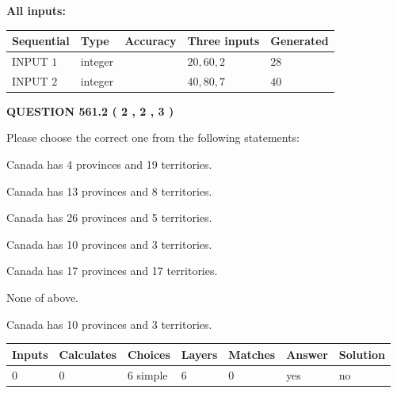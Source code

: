 \documentclass[12pt]{article}
\begin{document}
   
   
   
\noindent\vspace{0.1in}\hspace{-0.08in} {\textbf{\Large{All inputs: }}}
   
   
  
  
\noindent\begin{tabular}{|l|l|l|l|l|}
\hline
 Sequential & Type & Accuracy & Three inputs & Generated \\ 
\hline
 
 
  INPUT $  1 $ & integer &  & $
 20
 , 
 60
 , 
 2
 $ & $ 28 $ 
 \\  \hline  
 
 
  INPUT $  2 $ & integer &  & $
 40
 , 
 80
 , 
 7
 $ & $ 40 $ 
 \\  \hline  
 \end{tabular}
   
   
  
\vspace{0.2in}
  
{\textbf{\Large{QUESTION
561.2 
 ( 2 , 2 , 3 )
}}}
  
  
Please choose the correct one from the following statements:
 
 
Canada has   4 provinces and  19 territories.
 
 
Canada has  13 provinces and  8 territories.
 
 
Canada has  26 provinces and  5 territories.
 
 
Canada has 10  provinces and 3 territories.
 
 
Canada has  17 provinces and  17 territories.
 
 
 None of above.
 
 
\noindent{}
 
 
Canada has 10  provinces and 3 territories.
 
 
\noindent{}
 
 
   
   
   
   
\noindent\begin{tabular}{|l|l|l|l|l|l|l|}
 \hline
Inputs & Calculates & Choices & Layers & Matches & Answer & Solution \\ \hline
 0  & 
 0  & 
 6
  simple  
  & 
 6  & 
 0  & 
  yes & 
  no 
  \\ \hline
 \end{tabular}
   
\end{document}
